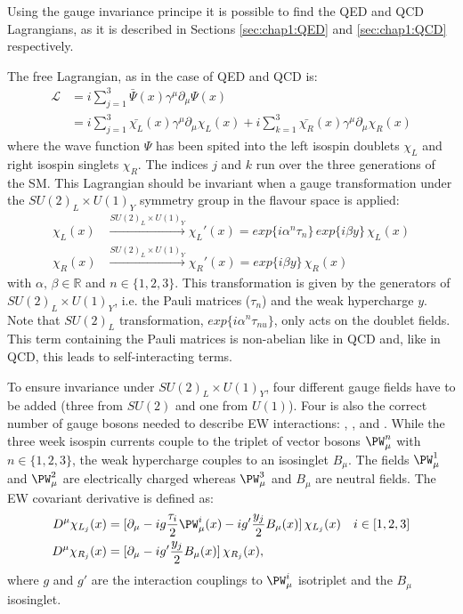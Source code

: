 Using the gauge invariance principe it is possible to find the QED and QCD Lagrangians, as it is described in Sections \ref{sec:chap1:QED} and \ref{sec:chap1:QCD} respectively.

The free Lagrangian, as in the case of QED and QCD is:
\begin{equation}\label{eq:chap1:EW:LagrangianFree}
\begin{split}
	\mathcal{L} 	&= i \sum_{j=1}^{3} \bar{\Psi}(x) \gamma^{\mu} \partial_{\mu} \Psi(x) \\
				& = i \sum_{j=1}^{3} \bar{\chi_{L}}(x) \gamma^{\mu} \partial_{\mu} \chi_{L}(x)+  i \sum_{k=1}^{3} \bar{\chi_{R}}(x) \gamma^{\mu} \partial_{\mu} \chi_{R}(x)
\end{split}
\end{equation}
where the wave function $\Psi$ has been spited into the left isospin doublets $\chi_{L}$ and right isospin singlets $\chi_{R}$. The indices $j$ and $k$ run over 
the three generations of the SM. 
This Lagrangian should be invariant when a gauge transformation under the $SU(2)_{L} \times U(1)_{Y}$ symmetry group in the flavour space is applied:
\begin{align}
	\chi_{L}(x) 	&\xrightarrow{\text{$SU(2)_{L} \times U(1)_{Y}$}} \chi_{L}'(x) =  exp\{ i \alpha^{n} \tau_{n} \}\, exp\{ i \beta y \}\,\chi_{L}(x) \\
	\chi_{R}(x) 	&\xrightarrow{\text{$SU(2)_{L} \times U(1)_{Y}$}} \chi_{R}'(x) =  exp\{ i \beta y \} \,\chi_{R}(x)
\end{align}
with $\alpha, \, \beta \in \mathds{R}$ and $n \in \{1,2,3 \}$.
This transformation is given by the generators of $SU(2)_{L} \times U(1)_{Y}$, i.e. the Pauli matrices ($\tau_{n}$) and the weak hypercharge $y$. 
Note that $SU(2)_L$ transformation, $exp\{ i \alpha^{n} \tau_{nu} \}$, only acts on the doublet fields. This term containing the Pauli matrices is 
non-abelian like in QCD and, like in QCD, this leads to self-interacting terms.

To ensure invariance under  $SU(2)_{L} \times U(1)_{Y}$, four different gauge fields have to be added (three from $SU(2)$ and one from $U(1)$).
Four is also the correct number of gauge bosons needed to describe EW interactions: \PWplus, \PWminus, \PZ and \Pgamma.
While the three week isospin currents couple to the triplet of vector bosons $\PW^{n}_{\mu}$ with $n \in \{1,2,3 \}$, the weak hypercharge
couples to an isosinglet $B_\mu$.  The fields $\PW^{1}_{\mu}$ and $\PW^{2}_{\mu}$ are electrically charged whereas $\PW^{3}_{\mu}$ and $B_\mu$
are neutral fields. 
The EW covariant derivative is defined as:
\begin{align}
	D^{\mu} \chi_{L_{j}}(x)	& =  [\partial_{\mu} - i g \frac{\tau_{i}}{2}\PW^{i}_{\mu}(x)  - i g' \frac{y_j}{2}  B_{\mu}(x) ] \, \chi_{L_{j}} (x)  &&  i \in [1,2,3] 	\label{eq:chap1:EW:CovariantDerivatice1} \\
	D^{\mu} \chi_{R_{j}}(x)	& = [\partial_{\mu} - i g' \frac{y_j}{2}  B_{\mu}(x)] \,\chi_{R_{j}}(x)		,										\label{eq:chap1:EW:CovariantDerivatice2}
\end{align}
where $g$ and $g'$ are the interaction couplings to $\PW^{i}_\mu$ isotriplet and the $B_{\mu}$ isosinglet.

